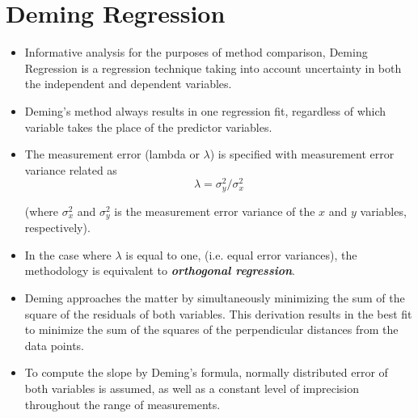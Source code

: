 \documentclass[12pt, a4paper]{report}
\theoremstyle{plain}
\theoremstyle{definition}
\theoremstyle{remark}
\begin{document}
\section{Deming Regression}

\begin{itemize}
	\item Informative analysis for the purposes of method comparison, Deming Regression is a regression technique taking into account uncertainty in both the independent and dependent variables.
	
	\item Deming’s method always results in one regression fit, regardless of which variable takes the place of the predictor variables.
	
	
	
	\item The measurement error (lambda or $\lambda$) is specified with measurement error variance related as 
	\[\lambda = \sigma^2_y/\sigma^2_x\]
	
	(where $\sigma^2_x$ and $\sigma^2_y$ is the measurement error variance of the $x$ and $y$ variables, respectively).
	
	\item In the case where $\lambda$ is equal to one, (i.e. equal error variances), the methodology is equivalent to \textit{\textbf{orthogonal regression}}.
	
	\item Deming approaches the matter by simultaneously minimizing the sum of the square of the residuals of both variables. This derivation results in the best fit to minimize the sum of the squares of the perpendicular distances from the data points.
	
	\item To compute the slope by Deming’s formula,  normally distributed error of both variables  is assumed, as well as a constant level of imprecision throughout the range of measurements.
	
\end{itemize}
\end{document}

